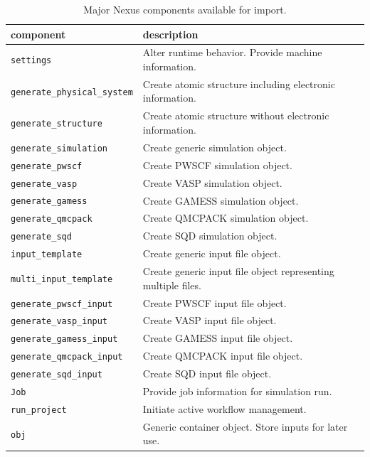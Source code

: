 \documentclass[oneside,11pt]{memoir}
\numberwithin{equation}{section}
\begin{document}
\FloatBarrier
\begin{table}[h]
\begin{center}
\begin{tabularx}{\textwidth}{l l}
   \hline
   \bfseries component                 & \bfseries description \\
   \hline
   \texttt{settings}                   & Alter runtime behavior.  Provide machine information.    \\
   \texttt{generate\_physical\_system} & Create atomic structure including electronic information.  \\
   \texttt{generate\_structure}        & Create atomic structure without electronic information.    \\
   \texttt{generate\_simulation}       & Create generic simulation object.    \\
   \texttt{generate\_pwscf}            & Create PWSCF simulation object.    \\
   \texttt{generate\_vasp}             & Create VASP simulation object.    \\
   \texttt{generate\_gamess}           & Create GAMESS simulation object.    \\
   \texttt{generate\_qmcpack}          & Create QMCPACK simulation object.    \\
   \texttt{generate\_sqd}              & Create SQD simulation object.    \\
   \texttt{input\_template}            & Create generic input file object. \\
   \texttt{multi\_input\_template}     & Create generic input file object representing multiple files.\\
   \texttt{generate\_pwscf\_input}     & Create PWSCF input file object.    \\
   \texttt{generate\_vasp\_input}      & Create VASP input file object.    \\
   \texttt{generate\_gamess\_input}    & Create GAMESS input file object.    \\
   \texttt{generate\_qmcpack\_input}   & Create QMCPACK input file object.    \\
   \texttt{generate\_sqd\_input}       & Create SQD input file object.    \\
   \texttt{Job}                        & Provide job information for simulation run.    \\
   \texttt{run\_project}               & Initiate active workflow management.     \\
   \texttt{obj}                        & Generic container object.  Store inputs for later use.  \\
  \hline
\end{tabularx}
\end{center}
\caption{Major Nexus components available for import.\label{tab:imports}}
\end{table}
\FloatBarrier
\end{document}
